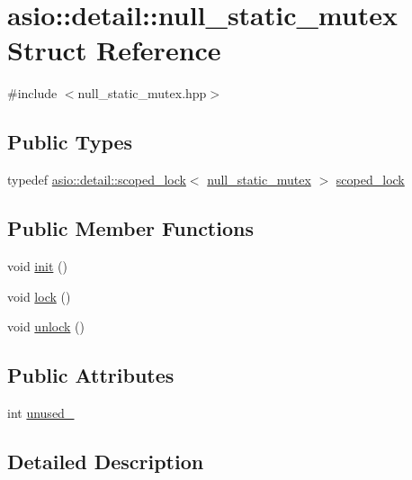 \hypertarget{structasio_1_1detail_1_1null__static__mutex}{}\section{asio\+:\+:detail\+:\+:null\+\_\+static\+\_\+mutex Struct Reference}
\label{structasio_1_1detail_1_1null__static__mutex}


{\ttfamily \#include $<$null\+\_\+static\+\_\+mutex.\+hpp$>$}

\subsection*{Public Types}
\begin{DoxyCompactItemize}
\item 
typedef \hyperlink{classasio_1_1detail_1_1scoped__lock}{asio\+::detail\+::scoped\+\_\+lock}$<$ \hyperlink{structasio_1_1detail_1_1null__static__mutex}{null\+\_\+static\+\_\+mutex} $>$ \hyperlink{structasio_1_1detail_1_1null__static__mutex_aba457250895d151e2d873fbda1a4a5a3}{scoped\+\_\+lock}
\end{DoxyCompactItemize}
\subsection*{Public Member Functions}
\begin{DoxyCompactItemize}
\item 
void \hyperlink{structasio_1_1detail_1_1null__static__mutex_a86f815756bd9ec7f51454dcfbd1a7a1b}{init} ()
\item 
void \hyperlink{structasio_1_1detail_1_1null__static__mutex_a2d6fcff41249adac226fe66037641470}{lock} ()
\item 
void \hyperlink{structasio_1_1detail_1_1null__static__mutex_ac0bf70b02fd736037b4f51ffb1a11a98}{unlock} ()
\end{DoxyCompactItemize}
\subsection*{Public Attributes}
\begin{DoxyCompactItemize}
\item 
int \hyperlink{structasio_1_1detail_1_1null__static__mutex_a0cfc4860ac23ca375273e89b27c94f05}{unused\+\_\+}
\end{DoxyCompactItemize}


\subsection{Detailed Description}


